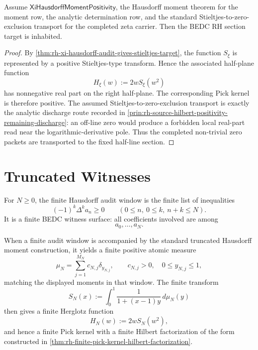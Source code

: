 \begin{theorem}
\label{thm:rh-xi-hausdorff-audit-conditionally-rh-sufficient}
Assume $\mathsf{XiHausdorffMomentPositivity}$, the Hausdorff moment
theorem for the moment row, the analytic determination row, and the
standard Stieltjes-to-zero-exclusion transport for the completed zeta
carrier. Then the BEDC RH section target is inhabited.
\end{theorem}

\begin{proof}
By
\autoref{thm:rh-xi-hausdorff-audit-gives-stieltjes-target}, the function
$S_{\xi}$ is represented by a positive Stieltjes-type transform. Hence
the associated half-plane function
$$
H_{\xi}(w):=2wS_{\xi}(w^2)
$$
has nonnegative real part on the right half-plane. The corresponding
Pick kernel is therefore positive. The assumed Stieltjes-to-zero-exclusion
transport is exactly the analytic discharge route recorded in
\autoref{prin:rh-source-hilbert-positivity-remaining-discharge}: an
off-line zero would produce a forbidden local real-part read near the
logarithmic-derivative pole. Thus the completed non-trivial zero packets
are transported to the fixed half-line section.
\end{proof}

\section{Truncated Witnesses}
\label{sec:rh-xi-hausdorff-truncated-witnesses}

\begin{definition}
\label{def:rh-xi-finite-hausdorff-audit-window}
For $N\ge0$, the finite Hausdorff audit window is the finite list of
inequalities
$$
(-1)^k\Delta^k a_n\ge0
\qquad
(0\le n,\ 0\le k,\ n+k\le N).
$$
It is a finite BEDC witness surface: all coefficients involved are among
$$
a_0,\ldots,a_N.
$$
\end{definition}

\begin{principle}
\label{prin:rh-xi-truncated-moments-produce-finite-packets}
When a finite audit window is accompanied by the standard truncated
Hausdorff moment construction, it yields a finite positive atomic
measure
$$
\mu_N
=
\sum_{j=1}^{M_N}c_{N,j}\delta_{y_{N,j}},
\qquad
c_{N,j}>0,\quad 0\le y_{N,j}\le1,
$$
matching the displayed moments in that window. The finite transform
$$
S_N(x)
:=
\int_0^1
\frac{1}{1+(x-1)y}
\,d\mu_N(y)
$$
then gives a finite Herglotz function
$$
H_N(w):=2wS_N(w^2),
$$
and hence a finite Pick kernel with a finite Hilbert factorization of the
form constructed in
\autoref{thm:rh-finite-pick-kernel-hilbert-factorization}.
\end{principle}

